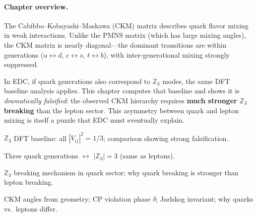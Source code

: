 
\paragraph{Chapter overview.}
The Cabibbo--Kobayashi--Maskawa (CKM) matrix describes quark flavor mixing in
weak interactions. Unlike the PMNS matrix (which has large mixing angles),
the CKM matrix is nearly diagonal---the dominant transitions are within
generations ($u \leftrightarrow d$, $c \leftrightarrow s$, $t \leftrightarrow b$),
with inter-generational mixing strongly suppressed.

In EDC, if quark generations also correspond to $\mathbb{Z}_3$ modes, the same
DFT baseline analysis applies. This chapter computes that baseline and shows
it is \emph{dramatically falsified}: the observed CKM hierarchy requires
\textbf{much stronger $\mathbb{Z}_3$ breaking} than the lepton sector.
This asymmetry between quark and lepton mixing is itself a puzzle that EDC
must eventually explain.


\begin{tcolorbox}[colback=blue!5, colframe=blue!50!black,
    title=\textbf{Reader Map: What This Chapter Establishes}]
\begin{description}[style=nextline, leftmargin=1em, font=\normalfont\bfseries]
    \item[Derived \tagDc{}:]
        $\mathbb{Z}_3$ DFT baseline: all $|V_{ij}|^2 = 1/3$;
        comparison showing strong falsification.

    \item[Identified \tagI{}:]
        Three quark generations $\leftrightarrow$ $|\mathbb{Z}_3| = 3$
        (same as leptons).

    \item[Postulated \tagP{}:]
        $\mathbb{Z}_3$ breaking mechanism in quark sector;
        why quark breaking is stronger than lepton breaking.

    \item[Open (not addressed):]
        CKM angles from geometry;
        CP violation phase $\delta$;
        Jarlskog invariant;
        why quarks vs.\ leptons differ.
\end{description}
\end{tcolorbox}

